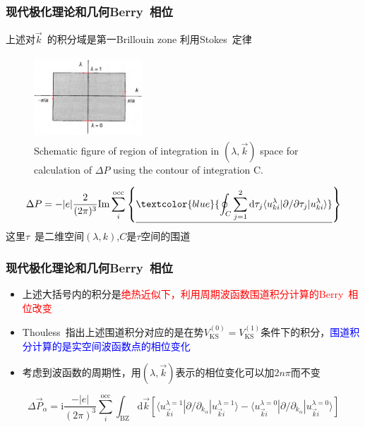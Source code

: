 {\frame
{
	\frametitle{现代极化理论和几何\textrm{Berry~}相位}
	上述对$\vec k$~的积分域是第一\textrm{Brillouin zone}
	利用\textrm{Stokes~}定律
\begin{figure}[h!]
\centering
\vspace*{-0.12in}
\includegraphics[height=1.2in,width=1.6in,viewport=0 0 800 540,clip]{Figures/Berry_contour_integration.png}
\caption{\tiny \textrm{Schematic figure of region of integration in $(\lambda,\vec k)$ space for calculation of $\Delta P$ using the contour of integration C.}}%
\label{Berry_contour_integration}
\end{figure} 
	\begin{displaymath}
		\Delta P=-|e|\frac2{(2\pi)^3}\mathrm{Im}\sum_i^{\mathrm{occ}}\left\{ \underline{\textcolor{blue}{\oint_C\sum_{j=1}^2\mathrm{d}\tau_j\langle u_{k i}^{\lambda}|\partial/\partial\tau_j|u_{k i}^{\lambda}\rangle}} \right\} 
	\end{displaymath}
这里$\tau$~是二维空间$(\lambda,k)$,$C$是$\tau$空间的围道
}

\frame
{
	\frametitle{现代极化理论和几何\textrm{Berry~}相位}
	\begin{itemize}
		\item 上述大括号内的积分是\textcolor{red}{绝热近似下，利用周期波函数围道积分计算的\textrm{Berry~}相位改变}%
		\item \textrm{Thouless~}指出上述围道积分对应的是在势$V_{\mathrm{KS}}^{(0)}=V_{\mathrm{KS}}^{(1)}$条件下的积分，\textcolor{blue}{围道积分计算的是实空间波函数点的相位变化}
		\item 考虑到波函数的周期性，用$(\lambda,\vec k)$表示的相位变化可以加$2n\pi$而不变
	\end{itemize}
	\begin{displaymath}
		\Delta\vec P_{\alpha}=\mathrm{i}\frac{-|e|}{(2\pi)^3}\sum_i^{\mathrm{occ}}\int_{\mathrm{BZ}}\mathrm{d}\vec k\left[ \langle u_{\vec k i}^{\lambda=1}|\partial/\partial_{k_{\alpha}}|u_{\vec k i}^{\lambda=1}\rangle-\langle u_{\vec k i}^{\lambda=0}|\partial/\partial_{k_{\alpha}}|u_{\vec k i}^{\lambda=0}\rangle \right]
	\end{displaymath}
}

}
